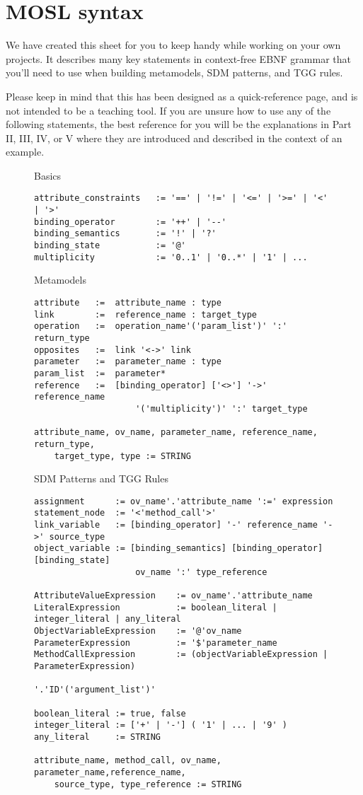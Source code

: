 \newpage
\section{MOSL syntax}
\texHeader

We have created this sheet for you to keep handy while working on your own projects. It describes many key statements in context-free EBNF grammar that you'll
need to use when building metamodels, SDM patterns, and TGG rules.

Please keep in mind that this has been designed as a quick-reference page, and is not intended to be a teaching tool. If you are unsure how to use any
of the following statements, the best reference for you will be the explanations in Part II, III, IV, or V where they are introduced and described in the
context of an example.

\begin{figure}[htbp]
Basics
\begin{lstlisting}[backgroundcolor=\color{codelightgray}]
attribute_constraints 	:= '==' | '!=' | '<=' | '>=' | '<' | '>'
binding_operator 		:= '++' | '--'
binding_semantics 		:= '!' | '?'
binding_state 			:= '@'
multiplicity 			:= '0..1' | '0..*' | '1' | ...
\end{lstlisting}

Metamodels
\begin{lstlisting}[backgroundcolor=\color{codelightgray}]
attribute	:=	attribute_name : type
link		:=	reference_name : target_type
operation	:=	operation_name'('param_list')' ':' return_type
opposites	:=	link '<->' link
parameter	:=	parameter_name : type
param_list	:=	parameter*
reference	:=	[binding_operator] ['<>'] '->' reference_name 
					'('multiplicity')' ':' target_type

attribute_name, ov_name, parameter_name, reference_name, return_type, 
	target_type, type := STRING
\end{lstlisting}

SDM Patterns and TGG Rules
\begin{lstlisting}[backgroundcolor=\color{codelightgray}]
assignment		:= ov_name'.'attribute_name ':=' expression
statement_node	:= '<'method_call'>'
link_variable 	:= [binding_operator] '-' reference_name '->' source_type
object_variable := [binding_semantics] [binding_operator] [binding_state] 
					ov_name ':' type_reference
										
AttributeValueExpression 	:= ov_name'.'attribute_name
LiteralExpression 			:= boolean_literal | integer_literal | any_literal
ObjectVariableExpression 	:= '@'ov_name
ParameterExpression 		:= '$'parameter_name
MethodCallExpression 		:= (objectVariableExpression | ParameterExpression)
									'.'ID'('argument_list')'

boolean_literal := true, false
integer_literal := ['+' | '-'] ( '1' | ... | '9' )
any_literal 	:= STRING

attribute_name, method_call, ov_name, parameter_name,reference_name, 
	source_type, type_reference := STRING
\end{lstlisting}
\end{figure}
